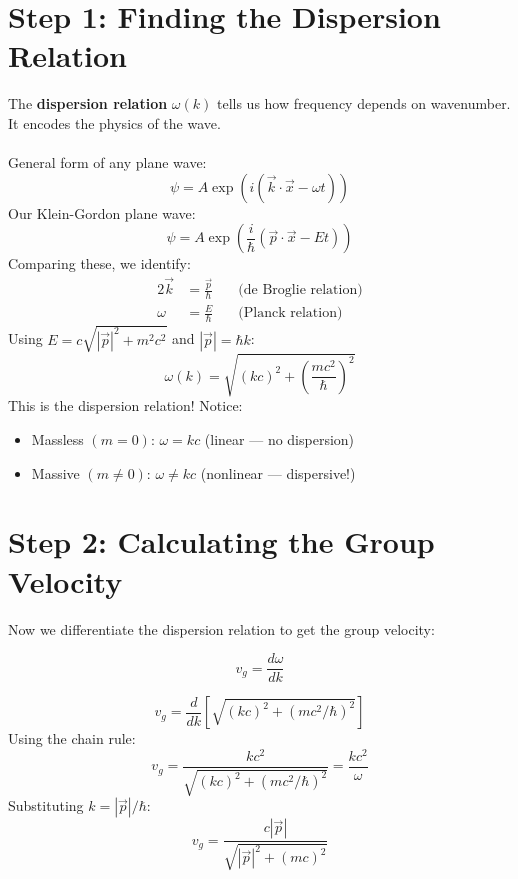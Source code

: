 \documentclass{report}
\begin{document}
\section{Step 1: Finding the Dispersion Relation}
The \textbf{dispersion relation} $\omega(k)$ tells us how frequency depends on wavenumber. It encodes the physics of the wave.\\
\\
General form of any plane wave:
\begin{equation}
	\psi = A \exp\left(i\left(\vec{k} \cdot \vec{x} - \omega t\right)\right)
\end{equation}
Our Klein-Gordon plane wave:
\begin{equation}
	\psi = A \exp\left(\frac{i}{\hbar}\left(\vec{p} \cdot \vec{x} - Et\right)\right)
\end{equation}
Comparing these, we identify:
\begin{alignat*}{2}
	\vec{k} & = \frac{\vec{p}}{\hbar} \quad & \text{(de Broglie relation)} \\
	\omega  & = \frac{E}{\hbar} \quad       & \text{(Planck relation)}
\end{alignat*}
Using $E = c\sqrt{|\vec{p}|^2 + m^2c^2}$ and $|\vec{p}| = \hbar k$:
\begin{equation}
	\omega(k) = \sqrt{(kc)^2 + \left(\frac{mc^2}{\hbar}\right)^2}
\end{equation}
This is the dispersion relation! Notice:
\begin{itemize}
	\item Massless $(m=0)$: $\omega = kc$ (linear --- no dispersion)
	\item Massive $(m \neq 0)$: $\omega \neq kc$ (nonlinear --- dispersive!)
\end{itemize}

\section{Step 2: Calculating the Group Velocity}
Now we differentiate the dispersion relation to get the group velocity:

\begin{equation}
	v_{g} = \frac{d \omega}{dk}
\end{equation}

\begin{equation}
	v_{g} = \frac{d}{dk}\left[\sqrt{(kc)^2 + (mc^2/\hbar)^2}\right]
\end{equation}
Using the chain rule:
\begin{equation}
	v_{g} = \frac{kc^2}{\sqrt{(kc)^2 + (mc^2/\hbar)^2}} = \frac{kc^2}{\omega}
\end{equation}
Substituting $k = |\vec{p}|/\hbar$:
\begin{equation}
	v_{g} = \frac{c|\vec{p}|}{\sqrt{|\vec{p}|^2 + (mc)^2}}
\end{equation}
\end{document}
